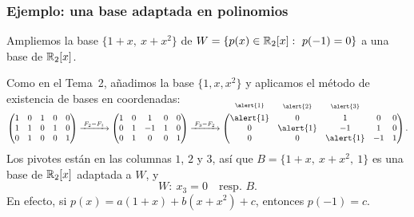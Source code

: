 \begin{frame}
    \frametitle{Ejemplo: una base adaptada en polinomios}

    \begin{example}
        Ampliemos la base $\{1+x,\ x+x^2\}$ de
        $W=\{p(x)\in\mathbb{R}_2[x]:\ p(-1)=0\}$ a una base de $\mathbb{R}_2[x]$.
    \end{example}

    Como en el Tema~2, añadimos la base $\{1,x,x^2\}$ y aplicamos el método
    de existencia de bases en coordenadas:
    \[
        \begin{pmatrix}
            1&0&1&0&0\\
            1&1&0&1&0\\
            0&1&0&0&1
        \end{pmatrix}
        \xrightarrow{\;F_2-F_1\;}
        \begin{pmatrix}
            1&0&1&0&0\\
            0&1&-1&1&0\\
            0&1&0&0&1
        \end{pmatrix}
        \xrightarrow{\;F_3-F_2\;}
        \begin{pmatrix}
            \smash{\overset{\raisebox{1.5ex}{$\scriptstyle\alert{1}$}}{\alert{1}}}&\smash{\overset{\raisebox{1.5ex}{$\scriptstyle\alert{2}$}}{0}}&\smash{\overset{\raisebox{1.5ex}{$\scriptstyle\alert{3}$}}{1}}&0&0\\
            0&\alert{1}&-1&1&0\\
            0&0&\alert{1}&-1&1
        \end{pmatrix}.
    \]
    Los pivotes están en las columnas $1$, $2$ y $3$, así que
    $B=\{1+x,\ x+x^2,\ 1\}$ es una base de $\mathbb{R}_2[x]$ adaptada a $W$, y
    \[
        W\colon\ x_3=0\quad\text{resp.\ }B.
    \]
    En efecto, si $p(x)=a(1+x)+b(x+x^2)+c$, entonces $p(-1)=c$.
\end{frame}
